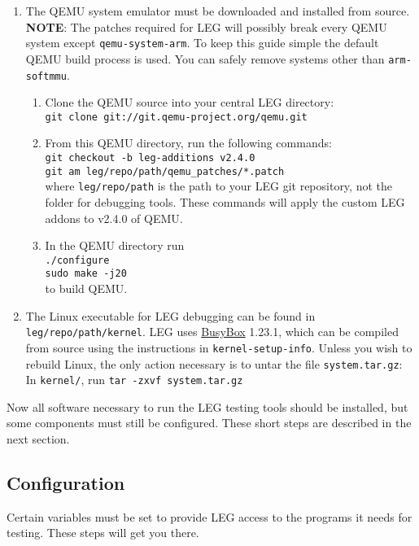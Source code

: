 \begin{enumerate}
\item The QEMU system emulator must be downloaded and installed from source. 
\textbf{NOTE}: The patches required for LEG will possibly break every QEMU system except \texttt{qemu-system-arm}. 
To keep this guide simple the default QEMU build process is used. 
You can safely remove systems other than \texttt{arm-softmmu}.
	\begin{enumerate}
	\item Clone the QEMU source into your central LEG directory: \\\texttt{git clone git://git.qemu-project.org/qemu.git}
	\item From this QEMU directory, run the following commands: \\\texttt{git checkout -b leg-additions v2.4.0 \\ git am leg/repo/path/qemu\_patches/*.patch}\\
	where \texttt{leg/repo/path} is the path to your LEG git repository, not the folder for debugging tools.
	These commands will apply the custom LEG addons to v2.4.0 of QEMU.
	\item In the QEMU directory run \\\texttt{./configure \\ sudo make -j20}\\ to build QEMU.
	\end{enumerate}
	
\item The Linux executable for LEG debugging can be found in \\\texttt{leg/repo/path/kernel}. 
LEG uses \href{https://www.busybox.net}{BusyBox} 1.23.1, which can be compiled from source using the instructions in \texttt{kernel-setup-info}.
Unless you wish to rebuild Linux, the only action necessary is to untar the file \texttt{system.tar.gz}:
\\In \texttt{kernel/}, run \texttt{tar -zxvf system.tar.gz}
\end{enumerate}

Now all software necessary to run the LEG testing tools should be installed, but some components must still be configured.
These short steps are described in the next section.

\subsection{Configuration}\label{sec:cfg}

Certain variables must be set to provide LEG access to the programs it needs for testing.
These steps will get you there.


